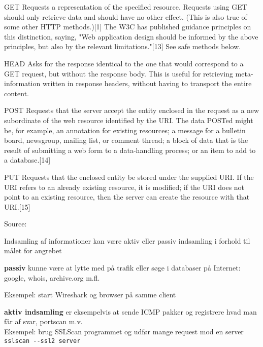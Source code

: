 \documentclass[20pt,landscape,a4paper,footrule]{foils}
\begin{document}
\begin{list2}
\item [GET]
Requests a representation of the specified resource. Requests using GET should only retrieve data and should have no other effect. (This is also true of some other HTTP methods.)[1] The W3C has published guidance principles on this distinction, saying, "Web application design should be informed by the above principles, but also by the relevant limitations."[13] See safe methods below.
\item [HEAD]
Asks for the response identical to the one that would correspond to a GET request, but without the response body. This is useful for retrieving meta-information written in response headers, without having to transport the entire content.
\item [POST]
Requests that the server accept the entity enclosed in the request as a new subordinate of the web resource identified by the URI. The data POSTed might be, for example, an annotation for existing resources; a message for a bulletin board, newsgroup, mailing list, or comment thread; a block of data that is the result of submitting a web form to a data-handling process; or an item to add to a database.[14]
\item [PUT]
Requests that the enclosed entity be stored under the supplied URI. If the URI refers to an already existing resource, it is modified; if the URI does not point to an existing resource, then the server can create the resource with that URI.[15]
\end{list2}

Source: 



\begin{list1}
\item Indsamling af informationer kan være aktiv eller passiv indsamling i forhold
  til målet for angrebet
\item {\bf passiv} kunne være at lytte med på trafik eller søge i databaser
  på Internet: google, whois, archive.org m.fl.

Eksempel: start Wireshark og browser på samme client

\vskip 1cm
\item {\bf aktiv indsamling} er eksempelvis at sende ICMP pakker og
  registrere hvad man får af svar, portscan m.v.\\

Eksempel: brug SSLScan programmet og udfør mange request mod en server\\
\verb+sslscan --ssl2 server+
\end{list1}
\end{document}
